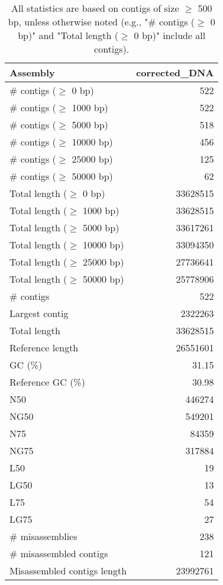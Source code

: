 \documentclass[12pt,a4paper]{article}
\begin{document}
\begin{table}[ht]
\begin{center}
\caption{All statistics are based on contigs of size $\geq$ 500 bp, unless otherwise noted (e.g., "\# contigs ($\geq$ 0 bp)" and "Total length ($\geq$ 0 bp)" include all contigs).}
\begin{tabular}{|l*{1}{|r}|}
\hline
Assembly & corrected\_DNA \\ \hline
\# contigs ($\geq$ 0 bp) & 522 \\ \hline
\# contigs ($\geq$ 1000 bp) & 522 \\ \hline
\# contigs ($\geq$ 5000 bp) & 518 \\ \hline
\# contigs ($\geq$ 10000 bp) & 456 \\ \hline
\# contigs ($\geq$ 25000 bp) & 125 \\ \hline
\# contigs ($\geq$ 50000 bp) & 62 \\ \hline
Total length ($\geq$ 0 bp) & 33628515 \\ \hline
Total length ($\geq$ 1000 bp) & 33628515 \\ \hline
Total length ($\geq$ 5000 bp) & 33617261 \\ \hline
Total length ($\geq$ 10000 bp) & 33094350 \\ \hline
Total length ($\geq$ 25000 bp) & 27736641 \\ \hline
Total length ($\geq$ 50000 bp) & 25778906 \\ \hline
\# contigs & 522 \\ \hline
Largest contig & 2322263 \\ \hline
Total length & 33628515 \\ \hline
Reference length & 26551601 \\ \hline
GC (\%) & 31.15 \\ \hline
Reference GC (\%) & 30.98 \\ \hline
N50 & 446274 \\ \hline
NG50 & 549201 \\ \hline
N75 & 84359 \\ \hline
NG75 & 317884 \\ \hline
L50 & 19 \\ \hline
LG50 & 13 \\ \hline
L75 & 54 \\ \hline
LG75 & 27 \\ \hline
\# misassemblies & 238 \\ \hline
\# misassembled contigs & 121 \\ \hline
Misassembled contigs length & 23992761 \\ \hline

\end{tabular}
\end{center}
\end{table}
\end{document}

